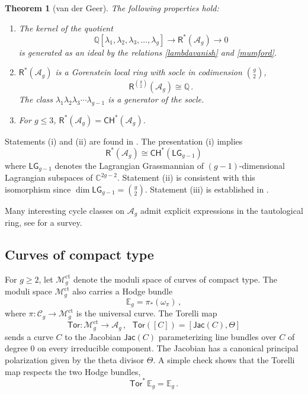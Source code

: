 \documentclass[11pt]{amsart}
\newtheorem{thm}{Theorem}
\theoremstyle{definition}
\newcommand{\qq}{\mathbb{Q}}
\newcommand{\R}{\mathsf{R}}
\newcommand{\A}{\mathcal{A}}
\newcommand{\CH}{\mathsf{CH}}
\DeclareMathOperator{\ct}{ct}
\newcommand{\Tor}{\mathsf{Tor}}
\begin{document}
\begin{thm}[van der Geer]\label{vdgthm}\leavevmode  The following
properties hold:
\begin{enumerate}
    \item[\textnormal{(i)}] The kernel
    of 
    the quotient
     $$\mathbb{Q}[\lambda_1,
\lambda_2, \lambda_3,  \ldots, \lambda_g] \rightarrow
\mathsf{R}^*(\mathcal{A}_g)\rightarrow 0$$
is generated as an ideal by
the  relations \eqref{lambdavanish} and \eqref{mumford}. 
   \item [\textnormal{(ii)}] $\R^*(\A_g)$ is a Gorenstein local ring with socle in codimension $\binom{g}{2}$,
   $$\R^{\binom{g}{2}}(\A_g) \cong 
   \qq\, .$$
   The class $\lambda_1\lambda_2 \lambda_3 \cdots \lambda_{g-1}$ is
   a generator of the socle.
    \item [\textnormal{(iii)}] For $g\leq 3$, $\R^*(\A_g)=\CH^*(\A_g)$.
\end{enumerate}
\end{thm}
Statements (i) and (ii) are found in \cite {vdg}.  
The presentation (i) implies $$\mathsf {R}^*(\mathcal A_g)\cong \CH^*(\mathsf{LG}_{g-1})$$ where ${\mathsf{LG}_{g-1}}$ denotes the Lagrangian Grassmannian of $(g-1)$-dimensional Lagrangian subspaces of $\mathbb C^{2g-2}.$ Statement (ii) is consistent with this isomorphism since $\dim {\mathsf {LG}}_{g-1}=\binom{g}{2}.$  
Statement (iii) is established in \cite{vdg2}.

Many interesting cycle classes on $\A_g$ admit explicit expressions in the tautological ring, see \cite {vdgsurvey} for a survey.  

\subsection{Curves of compact type}
For $g \geq 2$,
let $\mathcal M_g^{\ct}$ denote the moduli space of curves of compact type.  The moduli space $\mathcal M_g^{\ct}$ also carries a Hodge bundle $$\mathbb E_g=\pi_{*}(\omega_{\pi})\, ,$$ where $\pi:\mathcal C_g\to \mathcal M_g^{\ct}$ is the universal curve. The Torelli map $$\Tor: \mathcal M_g^{\ct}\to \mathcal A_g\, , \ \ \ \Tor([C])=[\mathsf{Jac}(C),\Theta]$$ 
sends a curve $C$ to the Jacobian $\mathsf{Jac } (C)$ parameterizing line bundles over $C$ of degree $0$ on every irreducible component. The Jacobian
has a canonical principal polarization given by the theta divisor $\Theta$.
A simple check shows that
the Torelli map respects  the two Hodge bundles, $$\Tor^* \,\mathbb E_g = \mathbb E_g \, .$$ 
\end{document}

